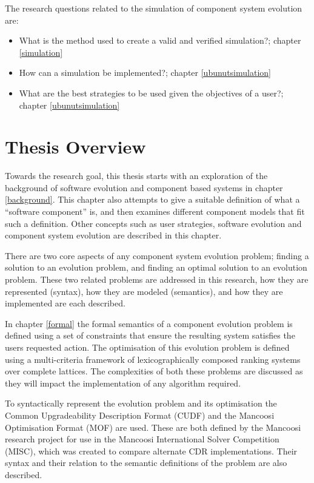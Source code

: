 The research questions related to the simulation of component system evolution are: 
\begin{itemize}
	\item What is the method used to create a valid and verified simulation?;  chapter \ref{simulation}
	\item How can a simulation be implemented?;  chapter \ref{ubunutsimulation}
	\item What are the best strategies to be used given the objectives of a user?;  chapter \ref{ubunutsimulation}
\end{itemize}

\section{Thesis Overview}
Towards the research goal, this thesis starts with an exploration of the background of software evolution and component based systems in chapter \ref{background}.
This chapter also attempts to give a suitable definition of what a ``software component'' is, and then examines different component models that fit such a definition.
Other concepts such as user strategies, software evolution and component system evolution are described in this chapter.

There are two core aspects of any component system evolution problem; 
finding a solution to an evolution problem, and finding an optimal solution to an evolution problem.
These two related problems are addressed in this research, how they are represented (syntax), how they are modeled (semantics), and how they are implemented are each described.

In chapter \ref{formal} the formal semantics of a component evolution problem is defined using a set of constraints that ensure the resulting system satisfies the users requested action.
The optimisation of this evolution problem is defined using a multi-criteria framework of lexicographically composed ranking systems over complete lattices.
The complexities of both these problems are discussed as they will impact the implementation of any algorithm required.

To syntactically represent the evolution problem and its optimisation the Common Upgradeability Description Format (CUDF) \citep{treinen2009common} and the Mancoosi Optimisation Format (MOF) are used.
These are both defined by the Mancoosi research project for use in the Mancoosi International Solver Competition (MISC), 
which was created to compare alternate CDR implementations.
Their syntax and their relation to the semantic definitions of the problem are also described.

